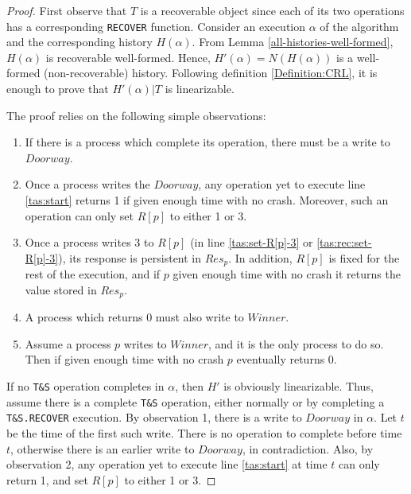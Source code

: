 \begin{proof}
	
	First observe that $T$ is a recoverable object since each of its two operations has a corresponding \texttt{RECOVER} function. Consider an execution $\alpha$ of the algorithm and the corresponding history $H(\alpha)$. From Lemma \ref{all-histories-well-formed}, $H(\alpha)$ is recoverable well-formed. Hence, $H'(\alpha)=N(H(\alpha))$ is a well-formed (non-recoverable) history. Following definition \ref{Definition:CRL}, it is enough to prove that $H'(\alpha) | T$ is  linearizable.
	
	The proof relies on the following simple observations:
	\begin{enumerate} [noitemsep,topsep=0pt]
		\item If there is a process which  complete its operation, there must be a write to $Doorway$. \label{tas-proof:obs1}
		\item Once a process writes the $Doorway$, any operation yet to execute line \ref{tas:start} returns 1 if given enough time with no crash. Moreover, such an operation can only set $R[p]$ to either 1 or 3. \label{tas-proof:obs2}
		\item Once a process writes 3 to $R[p]$ (in line \ref{tas:set-R[p]-3} or \ref{tas:rec:set-R[p]-3}), its response is persistent in $Res_p$. In addition, $R[p]$ is fixed for the rest of the execution, and if $p$ given enough time with no crash it returns the value stored in $Res_p$. \label{tas-proof:obs3}
		\item A process which returns 0 must also write to $Winner$. \label{tas-proof:obs4}
		\item Assume a process $p$ writes to $Winner$, and it is the only process to do so. Then if given enough time with no crash $p$ eventually returns 0. \label{tas-proof:obs5}
	\end{enumerate}
	
	
	
	If no \texttt{T\&S} operation completes in $\alpha$, then $H'$ is obviously linearizable. Thus, assume there is a complete \texttt{T\&S} operation, either normally or by completing a \texttt{T\&S.RECOVER} execution. By observation 1, there is a write to $Doorway$ in $\alpha$. Let $t$ be the time of the first such write. There is no operation to complete before time $t$, otherwise there is an earlier write to $Doorway$, in contradiction. Also, by observation 2, any operation yet to execute line \ref{tas:start} at time $t$ can only return 1, and set $R[p]$ to either 1 or 3.
	

\end{proof}
